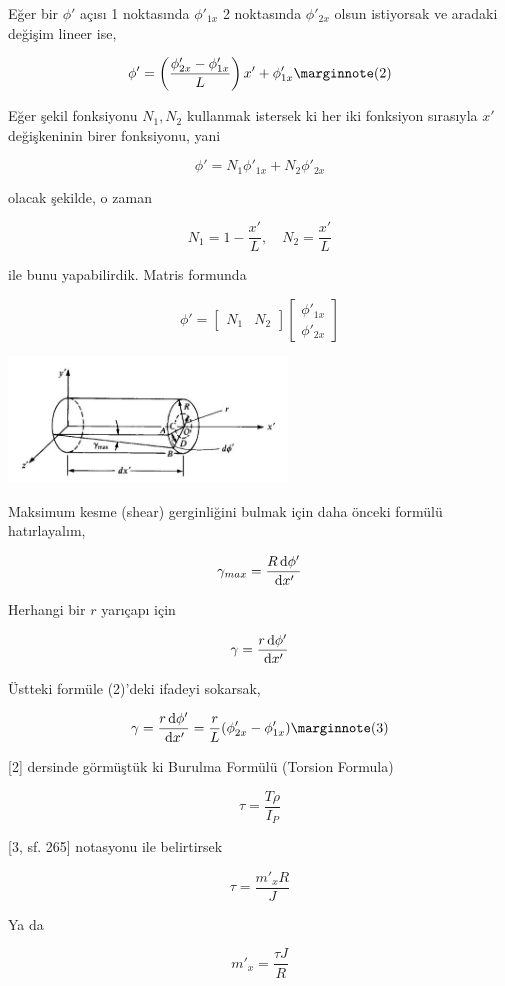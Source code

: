 \documentclass[12pt,fleqn]{article}\usepackage{../../common}
\begin{document}
Eğer bir $\phi'$ açısı 1 noktasında $\phi'_{1x}$ 2 noktasında $\phi'_{2x}$
olsun istiyorsak ve aradaki değişim lineer ise,

$$
\phi' = \left( \frac{\phi'_{2x} - \phi'_{1x}}{L}  \right) x' + \phi'_{1x}
\mlabel{2}
$$

Eğer şekil fonksiyonu $N_1,N_2$ kullanmak istersek ki her iki fonksiyon
sırasıyla $x'$ değişkeninin birer fonksiyonu, yani

$$
\phi' = N_1 \phi'_{1x} + N_2 \phi'_{2x}
$$

olacak şekilde, o zaman

$$
N_1 = 1 - \frac{x'}{L}, \quad N_2 = \frac{x'}{L}
$$

ile bunu yapabilirdik. Matris formunda

$$
\phi' = [\begin{array}{cc} N_1 & N_2 \end{array}]
\left[\begin{array}{c}
\phi'_{1x} \\ \phi'_{2x}
\end{array}\right]
$$

\includegraphics[width=20em]{compscieng_bpp43fem_03.jpg}

Maksimum kesme (shear) gerginliğini bulmak için daha önceki formülü
hatırlayalım,

$$
\gamma_{max} = \frac{R \,\mathrm{d} \phi'}{\,\mathrm{d} x'}
$$

Herhangi bir $r$ yarıçapı için

$$
\gamma = \frac{r \,\mathrm{d} \phi'}{\,\mathrm{d} x'}
$$

Üstteki formüle (2)'deki ifadeyi sokarsak,

$$
\gamma =
\frac{r \ud \phi'}{\ud x'} =
\frac{r}{L} ( \phi'_{2x} - \phi'_{1x}  )
\mlabel{3}
$$

[2] dersinde görmüştük ki Burulma Formülü (Torsion Formula)

$$
\tau = \frac{T\rho}{I_P}
$$

[3, sf. 265] notasyonu ile belirtirsek 

$$
\tau = \frac{m'_x R}{J}
$$

Ya da

$$
m'_x = \frac{\tau J}{R}
$$
\end{document}

